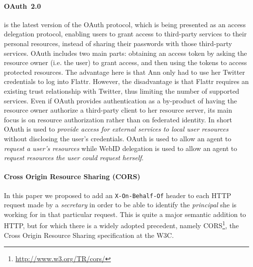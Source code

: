 \documentclass[a4paper]{llncs}
\begin{document}
\paragraph{OAuth~2.0}\cite{hardt-d-2012--a} is the latest version of the OAuth protocol, which is being presented as an access delegation protocol, enabling users to grant access to third-party services to their personal resources, instead of sharing their passwords with those third-party services.
OAuth includes two main parts: obtaining an access token by asking the resource owner (i.e. the user) to grant access, and then using the tokens to access protected resources. 
The advantage here is that Ann only had to use her Twitter credentials to log into Flattr.  However, the disadvantage is that Flattr requires an existing trust relationship with Twitter, thus limiting the number of supported services.
Even if OAuth provides authentication as a by-product of having the resource owner authorize a third-party client to her resource server, its main focus is on resource authorization rather than on federated identity.
In short OAuth is used to \textit{provide access for external services to local user resources} without disclosing the user's credentials.
OAuth is used to allow an agent to \textit{request a user's resources} while WebID delegation is used to allow an agent to \textit{request resources the user could request herself}.

\paragraph{Cross Origin Resource Sharing (CORS)}
In this paper we proposed to add an \lstinline|X-On-Behalf-Of| header to each HTTP request made by a \textit{secretary} in order to be able to identify the \textit{principal} she is working for in that particular request.
This is quite a major semantic addition to HTTP, but for which there is a widely adopted precedent, namely CORS\footnote{\url{http://www.w3.org/TR/cors/}}, the Cross Origin Resource Sharing specification at the W3C.
\end{document}
